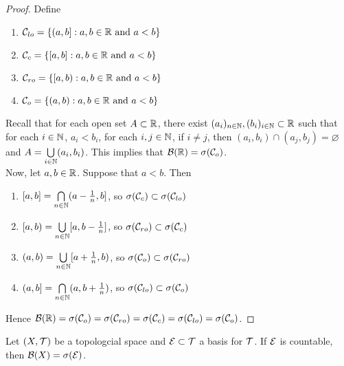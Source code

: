 \documentclass{book}
\begin{document}
	\begin{proof}
		Define 
		\begin{enumerate}
			\item $\mathcal{C}_{lo} = \{(a,b]:a,b \in \mathbb{R} \text{ and } a<b\}$\\
			\item $\mathcal{C}_{c} = \{[a,b]:a,b \in \mathbb{R} \text{ and } a<b\}$\\
			\item $\mathcal{C}_{ro} = \{[a,b):a,b \in \mathbb{R} \text{ and } a<b\}$\\
			\item $\mathcal{C}_{o} = \{(a,b):a,b \in \mathbb{R} \text{ and } a<b\}$\\
		\end{enumerate} 
		Recall that for each open set $A \subset \mathbb{R}$, there exist $(a_i)_{n \in \mathbb{N}}, (b_i)_{i \in \mathbb{N}} \subset \mathbb{R}$ such that for each $i \in \mathbb{N}$, $a_i < b_i$, for each $i,j \in \mathbb{N}$, if $i \neq j$, then $(a_i,b_i) \cap (a_j, b_j) = \varnothing$ and $A = \bigcup\limits_{i \in \mathbb{N}}(a_i, b_i)$. This implies that $\mathcal{B}(\mathbb{R}) = \sigma(\mathcal{C}_o)$. \vspace{2mm}\\
		Now, let $a,b \in \mathbb{R}$. Suppose that $a<b$. Then 
		\begin{enumerate}
			\item $[a,b] = \bigcap\limits_{n \in \mathbb{N}}(a- \frac{1}{n}, b]$, so $\sigma(\mathcal{C}_{c}) \subset \sigma(\mathcal{C}_{lo})$\\
			\item $[a,b) = \bigcup\limits_{n \in \mathbb{N}} [a,b-\frac{1}{n}]$, so $\sigma(\mathcal{C}_{ro}) \subset \sigma(\mathcal{C}_{c})$ \\
			\item $(a,b) = \bigcup\limits_{n \in \mathbb{N}} [a+\frac{1}{n},b)$, so $\sigma(\mathcal{C}_{o}) \subset \sigma(\mathcal{C}_{ro})$\\
			\item $(a,b] = \bigcap\limits_{n \in \mathbb{N}} (a,b+\frac{1}{n})$, so $\sigma(\mathcal{C}_{lo}) \subset \sigma(\mathcal{C}_{o})$\\
		\end{enumerate}
		Hence $\mathcal{B}(\mathbb{R}) = \sigma(\mathcal{C}_o) = \sigma(\mathcal{C}_{ro}) = \sigma(\mathcal{C}_{c}) = \sigma(\mathcal{C}_{lo}) = \sigma(\mathcal{C}_{o})$. 
	\end{proof}

	\begin{ex} 
		Let $(X, \mathcal{T})$ be a topologcial space and $\mathcal{E} \subset \mathcal{T}$ a basis for $\mathcal{T}$. If $\mathcal{E}$ is countable, then $\mathcal{B}(X) = \sigma(\mathcal{E})$.  
	\end{ex}
\end{document}
